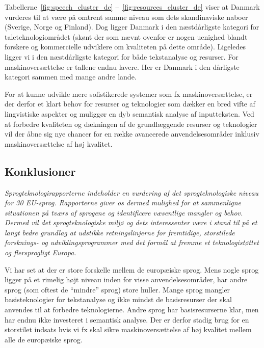 \begin{multicols}{2}
Tabellerne~\ref{fig:speech_cluster_de} --~\ref{fig:resources_cluster_de} viser at Danmark vurderes til at v\ae re \mbox{p\aa} omtrent samme niveau som dets skandinaviske naboer (Sverige, Norge og Finland). Dog ligger Danmark i den næstd\aa rligste kategori for taleteknologiomr\aa det (sk\o nt der som n\ae vnt ovenfor er nogen uenighed blandt forskere og kommercielle udviklere om kvaliteten \mbox{p\aa} dette omr\aa de). Ligeledes ligger vi i den n\ae std\aa rligste kategori for b\aa de tekstanalyse og resurser. For maskinovers\ae ttelse er tallene endnu lavere. Her er Danmark i den d\aa rligste kategori sammen med mange andre lande. 

For at kunne udvikle mere sofistikerede systemer som fx maskinovers\ae ttelse, er der derfor et klart behov for resurser og teknologier som d\ae kker en bred vifte af lingvistiske aspekter og muligg\o r en dyb semantisk ana\-lyse af inputteksten. Ved at forbedre kvaliteten og d\ae kningen af de grundl\ae ggende resurser og teknologier vil der \aa bne sig nye chancer for en r\ae kke avancerede anvendelsesomr\aa der inklusiv maskinovers\ae ttelse af h\o j kvalitet.

\subsection{Konklusioner}

\emph{Sprogteknologirapporterne indeholder en vurdering af det sprogteknologiske niveau for 30 EU-sprog. Rapporterne giver os dermed mulighed for at sammenligne situationen \mbox{p\aa} tv\ae rs af sprogene og identificere v\ae sentlige mangler og behov. Dermed vil det sprogteknologiske \mbox{milj\o}  og dets interessenter v\ae re i stand til \mbox{p\aa} et langt bedre grundlag at udstikke retningslinjerne for fremtidige, storstilede forsknings- og udviklingsprogrammer med det form\aa l at fremme et teknologist\o ttet og flersprogligt Europa.}

Vi har set at der er store forskelle mellem de europ\ae iske sprog. Mens nogle sprog ligger \mbox{p\aa} et rimelig h\o jt niveau inden for visse anvendelsesomr\aa der, har andre sprog (som oftest de ``mindre'' sprog) store huller. Mange sprog mangler basisteknologier for tekstanalyse og ikke mindst de basisresurser der skal anvendes til at forbedre teknologierne. Andre sprog har basisresurserne klar, men har endnu ikke investeret i semantisk analyse. Der er derfor stadig brug for en storstilet indsats hvis vi fx skal sikre maskinovers\ae ttelse af h\o j kvalitet mellem alle de europ\ae iske sprog.


\end{multicols}
